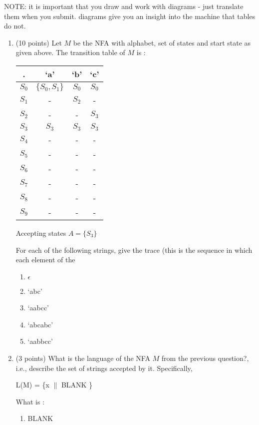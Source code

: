 \documentclass[10pt]{article}
\begin{document}
NOTE: it is important that you draw and work with diagrams - just translate them when you submit. diagrams give you an insight into  the machine that tables do not.
\newpage
\begin{enumerate}
    \item (10 points) Let $M$ be the NFA with alphabet, set of states and start state as given above. The transition table of $M$ is :
   \begin{center}
      \begin{tabular}{ |c|c|c|c| } 
        \hline
 .  & `a' & `b' & `c' \\\hline \hline
 $S_0$ & $\{S_0, S_1\}$ & $S_0$ & $S_0$\\ \hline
 $S_1$ & - & $S_2$ & - \\ \hline
 $S_2$ & - & - & $S_3$ \\ \hline
 $S_3$ & $S_3$ & $S_3$ & $S_3$ \\ \hline
 $S_4$ & - & - & - \\ \hline
 $S_5$ & - & - & - \\ \hline
 $S_6$ & - & - & - \\ \hline
 $S_7$ & - & - & - \\ \hline
 $S_8$ & - & - & - \\ \hline
 $S_9$ & - & - & - \\ \hline
\end{tabular}
\end{center}
Accepting states $A = \{S_3\}$

For each of the following strings, give the trace (this is the sequence in which each element of the 
\begin{enumerate}
    \item $\epsilon$
    \item  `abc'
    \item `aabcc'
    \item `abcabc'
    \item `aabbcc'
\end{enumerate}

\newpage 
\item (3 points) What is the language of the NFA $M$ from the previous question?, i.e., describe the set of strings accepted by it.
Specifically, 
\begin{center}
L(M) = \{x $\|$ BLANK \}
\end{center}

What is :
\begin{enumerate}
    \item BLANK
\end{enumerate} 



\end{enumerate}
\end{document}
